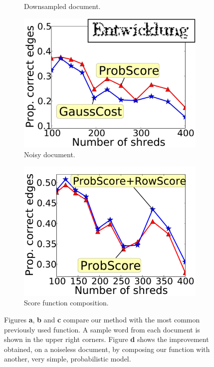 \documentclass{llncs}
\begin{document}
\begin{figure}[h]
\begin{subfigure}[b]{0.48\textwidth}
        \caption{Downsampled document.}
    \end{subfigure}
    \begin{subfigure}[b]{0.48\textwidth}
        \setlength{\abovecaptionskip}{1pt plus 1.0pt minus 2.0pt}
        \centering
        \includegraphics[width=\textwidth]{shuffleCompEnt300.jpg}
        \caption{Noisy document.}
    \end{subfigure}
    \begin{subfigure}[b]{0.48\textwidth}
        \setlength{\abovecaptionskip}{1pt plus 1.0pt minus 2.0pt}
        \centering
        \includegraphics[width=\textwidth]{rowComp.pdf}
        \caption{Score function composition.}
    \end{subfigure}
     \caption{Figures {\bf a}, {\bf b} and {\bf c} compare our method with the most common previously used function. A sample word from each document is shown in the upper right corners. Figure {\bf d} shows the improvement obtained, on a noiseless document, by composing our function with another, very simple, probabilistic model.}
    \label{fig:scoreComp}
\end{figure}
\end{document}
